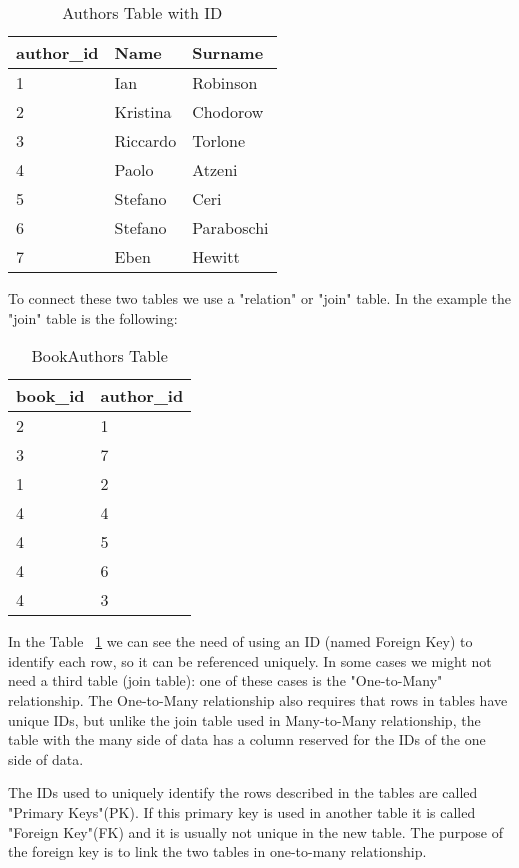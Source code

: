 \documentclass[a4page, 11pt]{article}
\theoremstyle{definition}
\begin{document}
\begin{table}[h]
	\centering
	\begin{tabular}{|l|l|l|}
		\hline
		
		\textbf{author\_id} & \textbf{Name} & \textbf{Surname}\\ 
		\hline
		1 & Ian & Robinson\\
		\hline
		2 & Kristina & Chodorow\\ 
		\hline
		3 & Riccardo & Torlone\\
		\hline
		4 & Paolo & Atzeni\\
		\hline
		5 & Stefano & Ceri\\
		\hline
		6 & Stefano & Paraboschi\\
		\hline
		7 & Eben & Hewitt\\
		\hline
		
	\end{tabular}
	\caption{Authors Table with ID}
\end{table}
To connect these two tables we use a "relation" or "join" table. In the example the "join" table is the following:
\begin{table}[h]
	\centering
	\begin{tabular}{|l|l|}
		\hline
		
		\textbf{book\_id} & \textbf{author\_id} \\
		\hline
		2 & 1\\
		\hline
		3 & 7\\
		\hline
		1 & 2\\
		\hline
		4 & 4\\
		\hline
		4 & 5\\
		\hline
		4 & 6\\
		\hline
		4 & 3\\
		\hline
	\end{tabular}
	\caption{BookAuthors Table}
	\label{table:join}
\end{table}

In the Table ~\ref{table:join} we can see the need of using an ID (named Foreign Key) to identify each row, so it can be referenced uniquely. 
In some cases we might not need a third table (join table): one of these cases is the "One-to-Many" relationship. 
The One-to-Many relationship also requires that rows in tables have unique IDs, but unlike the join table used in Many-to-Many relationship, the table with the many side of data has a column reserved for the IDs of the one side of data.

The IDs used to uniquely identify the rows described in the tables are called "Primary Keys"(PK). 
If this primary key is used in another table it is called "Foreign Key"(FK) and it is usually not unique in the new table. 
The purpose of the foreign key is to link the two tables in one-to-many relationship.
\end{document}
